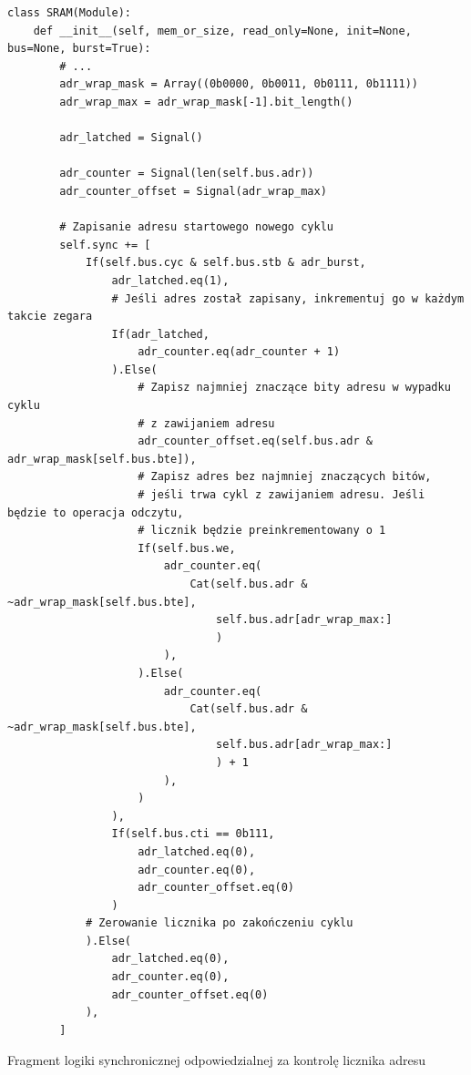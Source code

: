 \begin{longlisting}
\begin{verbatim}
class SRAM(Module):
    def __init__(self, mem_or_size, read_only=None, init=None, bus=None, burst=True):
        # ...
        adr_wrap_mask = Array((0b0000, 0b0011, 0b0111, 0b1111))
        adr_wrap_max = adr_wrap_mask[-1].bit_length()

        adr_latched = Signal()

        adr_counter = Signal(len(self.bus.adr))
        adr_counter_offset = Signal(adr_wrap_max)

        # Zapisanie adresu startowego nowego cyklu
        self.sync += [
            If(self.bus.cyc & self.bus.stb & adr_burst,
                adr_latched.eq(1),
                # Jeśli adres został zapisany, inkrementuj go w każdym takcie zegara
                If(adr_latched,
                    adr_counter.eq(adr_counter + 1)
                ).Else(
                    # Zapisz najmniej znaczące bity adresu w wypadku cyklu
                    # z zawijaniem adresu
                    adr_counter_offset.eq(self.bus.adr & adr_wrap_mask[self.bus.bte]),
                    # Zapisz adres bez najmniej znaczących bitów,
                    # jeśli trwa cykl z zawijaniem adresu. Jeśli będzie to operacja odczytu,
                    # licznik będzie preinkrementowany o 1
                    If(self.bus.we,
                        adr_counter.eq(
                            Cat(self.bus.adr & ~adr_wrap_mask[self.bus.bte],
                                self.bus.adr[adr_wrap_max:]
                                )
                        ),
                    ).Else(
                        adr_counter.eq(
                            Cat(self.bus.adr & ~adr_wrap_mask[self.bus.bte],
                                self.bus.adr[adr_wrap_max:]
                                ) + 1
                        ),
                    )
                ),
                If(self.bus.cti == 0b111,
                    adr_latched.eq(0),
                    adr_counter.eq(0),
                    adr_counter_offset.eq(0)
                )
            # Zerowanie licznika po zakończeniu cyklu
            ).Else(
                adr_latched.eq(0),
                adr_counter.eq(0),
                adr_counter_offset.eq(0)
            ),
        ]
\end{verbatim}
\caption{Fragment logiki synchronicznej odpowiedzialnej za kontrolę licznika adresu}
\label{lst:impl-sram-adrcounter}
\end{longlisting}

